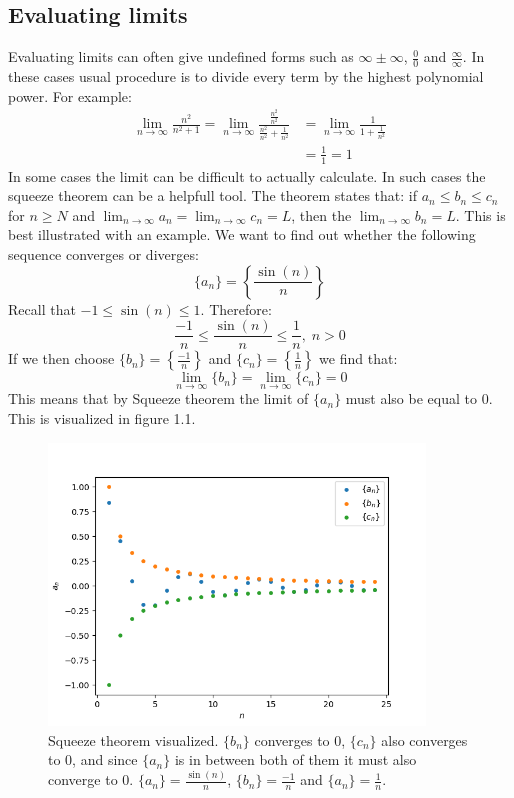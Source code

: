 \documentclass[11pt, a4paper]{article}
\begin{document}
\subsection{Evaluating limits}
Evaluating limits can often give undefined forms such as $\infty \pm \infty$, $\frac{0}{0}$ and $\frac{\infty}{\infty}$. In these cases usual procedure is to divide every term by the highest polynomial power. For example:
\begin{align*}
  \lim_{n\to\infty} \frac{n^2}{n^2 + 1} = \lim_{n\to\infty} \frac{\frac{n^2}{n^2}}{\frac{n^2}{n^2} + \frac{1}{n^2}} &= \lim_{n\to\infty} \frac{1}{1 + \frac{1}{n^2}}\\
  &= \frac{1}{1} = 1
\end{align*}
In some cases the limit can be difficult to actually calculate. In such cases the squeeze theorem can be a helpfull tool. The theorem states that: if $a_n \leq b_n \leq c_n$ for $n \geq N$ and $\lim_{n\to \infty} a_n = \lim_{n\to \infty} c_n = L$, then the $\lim_{n\to \infty} b_n = L$. This is best illustrated with an example.
We want to find out whether the following sequence converges or diverges:
\begin{equation*}
  \{a_n\} = \left\{ \frac{\sin(n)}{n} \right\}
\end{equation*}
Recall that $-1 \leq \sin(n) \leq 1$. Therefore:
\begin{equation*}
  \frac{-1}{n} \leq \frac{\sin(n)}{n} \leq \frac{1}{n}, \; n>0
\end{equation*} 
If we then choose $\{ b_n\} = \left\{ \frac{-1}{n} \right\}$ and  $\{ c_n\} = \left\{ \frac{1}{n} \right\}$ we find that:
\begin{equation*}
  \lim_{n\to\infty} \{b_n\} = \lim_{n\to\infty} \{c_n\} = 0
\end{equation*}
This means that by Squeeze theorem the limit of $\{a_n\}$ must also be equal to 0. This is visualized in figure 1.1.
\begin{figure}[h]
  \centerline{\includegraphics[width=100mm]{images/Squeeze_Theorem.png}}
  \caption{Squeeze theorem visualized. $\{ b_n\}$ converges to $0$, $\{ c_n\}$ also converges to $0$, and since $\{ a_n\}$ is in between both of them it must also converge to $0$. $\{ a_n\} = \frac{\sin(n)}{n}$, $\{ b_n\} = \frac{-1}{n}$ and $\{ a_n\} = \frac{1}{n}$.}
\end{figure}
\end{document}
